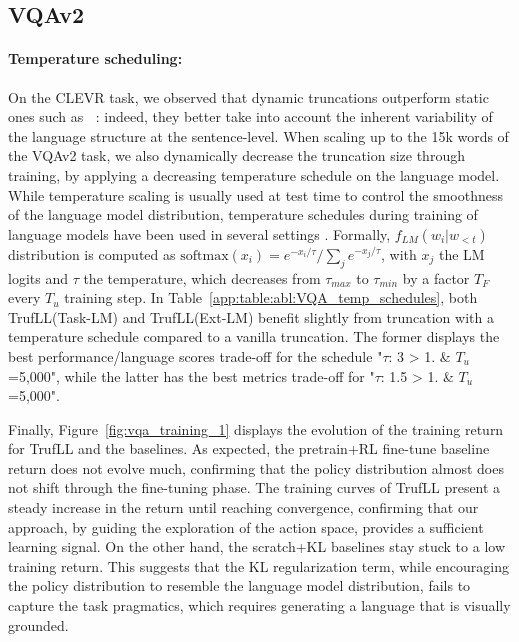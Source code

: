 \documentclass{article}
\newcommand{\algo}{TrufLL\xspace}
\DeclareMathOperator{\topk}{top(k)}
\begin{document}
\subsection{VQAv2}

\paragraph{Temperature scheduling:}
\label{sec:app:temperature}
On the CLEVR task, we observed that dynamic truncations outperform static ones such as $\topk$: indeed, they better take into account the inherent variability of the language structure at the sentence-level. When scaling up to the 15k words of the VQAv2 task, we also dynamically decrease the truncation size through training, by applying a decreasing temperature schedule on the language model.
While temperature scaling \cite{bahdanau2014neural} is usually used at test time to control the smoothness of the language model distribution, temperature schedules during training of language models have been used in several settings \cite{jang2016categorical,zhang2018heated, wang2020contextual}. Formally, $f_{LM}(w_i|w_{<t})$ distribution is computed as $\mathrm{softmax}(x_i)=e^{-x_i/\tau}/\sum_{j} e^{-x_{j}/\tau}$, with $x_j$ the LM logits and $\tau$ the temperature, which decreases from $\tau_{max}$ to $\tau_{min}$ by a factor $T_{F}$ every $T_{u}$ training step.  
In Table~\ref{app:table:abl:VQA_temp_schedules}, both \algo(Task-LM) and \algo(Ext-LM) benefit slightly from truncation with a temperature schedule compared to a vanilla truncation. 
The former displays the best performance/language scores trade-off for the schedule "$\tau$: 3 > 1. \& $T_{u}$=5,000", while the latter has the best metrics trade-off for "$\tau$: 1.5 > 1. \& $T_{u}$=5,000".  


Finally, Figure~\ref{fig:vqa_training_1} displays the evolution of the training return for \algo and the baselines. As expected, the pretrain+RL fine-tune baseline return does not evolve much, confirming that the policy distribution almost does not shift through the fine-tuning phase. The training curves of \algo present a steady increase in the return until reaching convergence, confirming that our approach, by guiding the exploration of the action space, provides a sufficient learning signal. On the other hand, the scratch+KL baselines stay stuck to a low training return. This suggests that the KL regularization term, while encouraging the policy distribution to resemble the language model distribution, fails to capture the task pragmatics, which requires generating a language that is visually grounded. 
\end{document}
